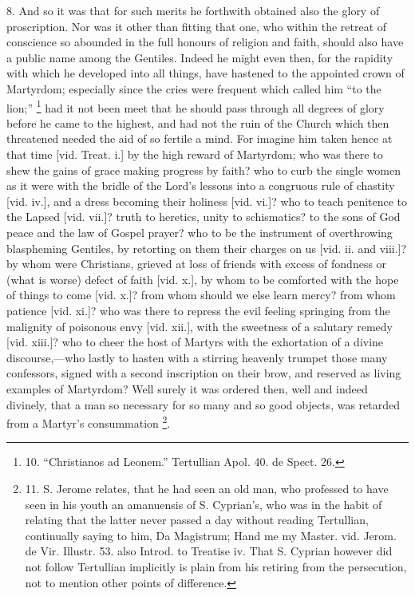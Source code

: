 8. And so it was that for such merits he forthwith obtained also the
glory of proscription. Nor was it other than fitting that one, who
within the retreat of conscience so abounded in the full honours of
religion and faith, should also have a public name among the Gentiles.
Indeed he might even then, for the rapidity with which he developed
into all things, have hastened to the appointed crown of Martyrdom;
especially since the cries were frequent which called him ``to
the lion;'' \footnote{10. ``Christianos
ad Leonem.'' Tertullian Apol. 40. de Spect. 26.} had it not
been meet that he should pass through all degrees of glory before he
came to the highest, and had not the ruin of the Church which then
threatened needed the aid of so fertile a mind. For imagine him taken
hence at that time [vid. Treat. i.] by
the high reward of Martyrdom; who was there to shew the gains of grace
making progress by faith? who to curb the single women as it were with
the bridle of the Lord's lessons into a congruous rule of chastity [vid.
iv.], and a dress becoming their holiness [vid.
vi.]? who to teach penitence to the Lapsed [vid.
vii.]? truth to heretics, unity to
schismatics? to the sons of God peace and the law of Gospel prayer?
who to be the instrument of overthrowing blaspheming Gentiles, by
retorting on them their charges on us [vid.
ii. and viii.]? by whom were Christians,
grieved at loss of friends with excess of fondness or (what is worse)
defect of faith [vid. x.],
by whom to be comforted with the hope of things to come [vid. x.]?
from whom should we else learn mercy? from whom patience [vid. xi.]?
who was there to repress the evil feeling springing from the malignity
of poisonous envy [vid. xii.], with the sweetness of a salutary remedy
[vid. xiii.]? who to cheer the host of Martyrs with the exhortation of
a divine discourse,—who lastly to hasten with a stirring heavenly
trumpet those many confessors, signed with a second inscription on
their brow, and reserved as living examples of Martyrdom? Well surely
it was ordered then, well and indeed divinely, that a man so necessary
for so many and so good objects, was retarded from a Martyr's
consummation \footnote{11. S.
Jerome relates, that he had seen an old man, who professed to have
seen in his youth an amanuensis of S. Cyprian's, who was in the habit
of relating that the latter never passed a day without reading
Tertullian, continually saying to him, Da Magistrum; Hand me my
Master. vid. Jerom. de Vir. Illustr. 53. also Introd. to Treatise iv.
That S. Cyprian however did not follow Tertullian implicitly is plain
from his retiring from the persecution, not to mention other points of
difference.}.

